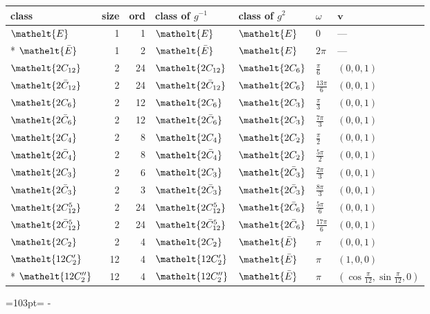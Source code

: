 \documentclass[10pt,a4paper]{article}
\newcommand{\needspace}[1]{\par\penalty-100\begingroup\dimen0=#1\relax\dimen2=\pagegoal
  \advance\dimen2-\pagetotal\ifdim\dimen0>\dimen2\relax\ifdim\dimen2>0pt\vfil\break\fi\fi
  \endgroup}
\numberwithin{equation}{section}
\newcommand{\eltfont}[1]{{\let\sigma\eltsigma\mathelt{#1}}}
\newcommand{\cls}[1]{\eltfont{#1}}
\newcommand{\dirvec}[3]{(#1, #2, #3)}
\newcommand{\vv}{\mathbf{v}}
\newcommand{\barred}[1]{\bar{#1}}
\begin{document}
{\renewcommand{\arraystretch}{1.3}\begin{longtable}{@{}lrrllll@{}}\toprule
class & size & ord & class of $g^{-1}$ & class of $g^{2}$ & $\omega$ & $\vv$\\\midrule\endhead
\bottomrule\endfoot\endlastfoot
$\cls{E}$ & 1 & 1 & $\cls{E}$ & $\cls{E}$ & $0$ & ---\\*
$\cls{\barred{E}}$ & 1 & 2 & $\cls{\barred{E}}$ & $\cls{E}$ & $2\pi$ & ---\\
$\cls{2C_{12}}$ & 2 & 24 & $\cls{2C_{12}}$ & $\cls{2C_{6}}$ & $\tfrac{\pi}{6}$ & $\dirvec{0}{0}{1}$\\
$\cls{2\barred{C}_{12}}$ & 2 & 24 & $\cls{2\barred{C}_{12}}$ & $\cls{2C_{6}}$ & $\tfrac{13\pi}{6}$ & $\dirvec{0}{0}{1}$\\
$\cls{2C_{6}}$ & 2 & 12 & $\cls{2C_{6}}$ & $\cls{2C_{3}}$ & $\tfrac{\pi}{3}$ & $\dirvec{0}{0}{1}$\\
$\cls{2\barred{C}_{6}}$ & 2 & 12 & $\cls{2\barred{C}_{6}}$ & $\cls{2C_{3}}$ & $\tfrac{7\pi}{3}$ & $\dirvec{0}{0}{1}$\\
$\cls{2C_{4}}$ & 2 & 8 & $\cls{2C_{4}}$ & $\cls{2C_{2}}$ & $\tfrac{\pi}{2}$ & $\dirvec{0}{0}{1}$\\
$\cls{2\barred{C}_{4}}$ & 2 & 8 & $\cls{2\barred{C}_{4}}$ & $\cls{2C_{2}}$ & $\tfrac{5\pi}{2}$ & $\dirvec{0}{0}{1}$\\
$\cls{2C_{3}}$ & 2 & 6 & $\cls{2C_{3}}$ & $\cls{2\barred{C}_{3}}$ & $\tfrac{2\pi}{3}$ & $\dirvec{0}{0}{1}$\\
$\cls{2\barred{C}_{3}}$ & 2 & 3 & $\cls{2\barred{C}_{3}}$ & $\cls{2\barred{C}_{3}}$ & $\tfrac{8\pi}{3}$ & $\dirvec{0}{0}{1}$\\
$\cls{2C_{12}^{5}}$ & 2 & 24 & $\cls{2C_{12}^{5}}$ & $\cls{2\barred{C}_{6}}$ & $\tfrac{5\pi}{6}$ & $\dirvec{0}{0}{1}$\\
$\cls{2\barred{C}_{12}^{5}}$ & 2 & 24 & $\cls{2\barred{C}_{12}^{5}}$ & $\cls{2\barred{C}_{6}}$ & $\tfrac{17\pi}{6}$ & $\dirvec{0}{0}{1}$\\
$\cls{2C_{2}}$ & 2 & 4 & $\cls{2C_{2}}$ & $\cls{\barred{E}}$ & $\pi$ & $\dirvec{0}{0}{1}$\\
$\cls{12C_{2}'}$ & 12 & 4 & $\cls{12C_{2}'}$ & $\cls{\barred{E}}$ & $\pi$ & $\dirvec{1}{0}{0}$\\*
$\cls{12C_{2}''}$ & 12 & 4 & $\cls{12C_{2}''}$ & $\cls{\barred{E}}$ & $\pi$ & $\dirvec{\cos\tfrac{\pi}{12}}{\sin\tfrac{\pi}{12}}{0}$\\
\bottomrule\end{longtable}}
\needspace{103pt}
\end{document}
